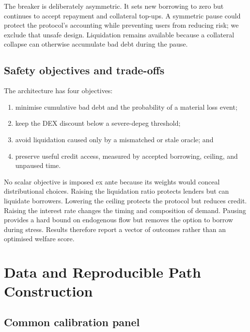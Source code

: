 \documentclass[sn-vancouver,Numbered]{sn-jnl}
\begin{document}
\begin{table}[t]
\centering
\caption{Architecture comparison.}\label{tab:architectures}
\small

\end{table}

The breaker is deliberately asymmetric. It sets new borrowing to zero but continues to accept repayment and collateral top-ups. A symmetric pause could protect the protocol's accounting while preventing users from reducing risk; we exclude that unsafe design. Liquidation remains available because a collateral collapse can otherwise accumulate bad debt during the pause.

\subsection{Safety objectives and trade-offs}

The architecture has four objectives:

\begin{enumerate}
  \item minimise cumulative bad debt and the probability of a material loss event;
  \item keep the DEX discount below a severe-depeg threshold;
  \item avoid liquidation caused only by a mismatched or stale oracle; and
  \item preserve useful credit access, measured by accepted borrowing, ceiling, and unpaused time.
\end{enumerate}

No scalar objective is imposed ex ante because its weights would conceal distributional choices. Raising the liquidation ratio protects lenders but can liquidate borrowers. Lowering the ceiling protects the protocol but reduces credit. Raising the interest rate changes the timing and composition of demand. Pausing provides a hard bound on endogenous flow but removes the option to borrow during stress. Results therefore report a vector of outcomes rather than an optimised welfare score.

\section{Data and Reproducible Path Construction}\label{sec:data}

\subsection{Common calibration panel}
\end{document}
